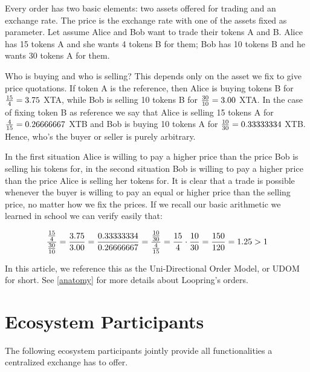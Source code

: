 \documentclass[UTF8,nofonts]{article}
\begin{document}
Every order has two basic elements: two assets offered for trading and an exchange rate. The price is the exchange rate with one of the assets fixed as parameter. Let assume Alice and Bob want to trade their tokens A and B. Alice has 15 tokens A and she wants 4 tokens B for them; Bob has 10 tokens B  and he wants 30 tokens A for them.

Who is buying and who is selling? This depends only on the asset we fix to give price quotations. If token A is the reference, then Alice is buying tokens B for ${15 \over 4} = 3.75$ XTA, while Bob is selling 10 tokens B for ${30 \over 10} = 3.00$ XTA. In the case of fixing token B as reference we say that Alice is selling 15 tokens A for ${4\over 15}=0.26666667$ XTB and Bob is buying 10 tokens A for ${10 \over 30}=0.33333334$ XTB. Hence, who's the buyer or seller is purely arbitrary.

In the first situation Alice is willing to pay a higher price than the price Bob is selling his tokens for, in the second situation Bob is willing to pay a higher price than the price Alice is selling her tokens for. It is clear that a trade is possible whenever the buyer is willing to pay an equal or higher price than the selling price, no matter how we fix the prices. If we recall our basic arithmetic we learned in school we can verify easily that:

\begin{equation}
{{15\over 4} \over {30\over 10}} = {3.75 \over 3.00}	= {0.33333334 \over 0.26666667} = {{10 \over 30} \over {4 \over 15}} = {15 \over 4} \cdot {10 \over 30} = {150 \over 120} = 1.25 > 1
\end{equation}

In this article, we reference this as the Uni-Directional Order Model, or UDOM for short. See \ref{anatomy} for more details about Loopring's orders.


\section{Ecosystem Participants}
The following ecosystem participants jointly provide all functionalities a centralized exchange has to offer. 
\end{document}
